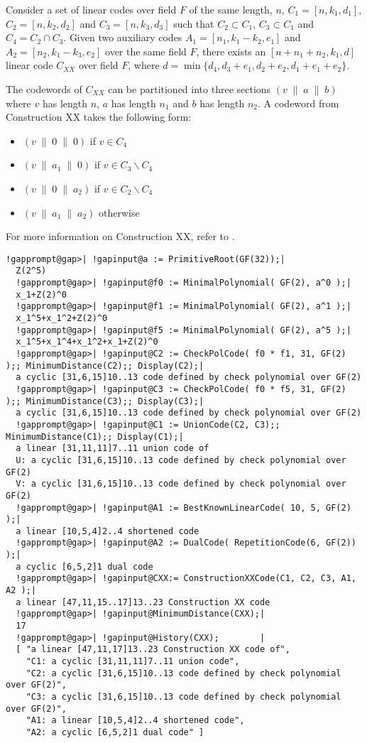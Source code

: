 \documentclass[a4paper,11pt]{report}
\begin{document}
{{{ Consider a set of linear codes over field $F$ of the same length, $n$, $C_1=[n, k_1, d_1]$, $C_2=[n, k_2, d_2]$ and $C_3=[n, k_3, d_3]$ such that $C_2 \subset C_1$, $C_3 \subset C_1$ and $C_4 = C_2 \cap C_3$. Given two auxiliary codes $A_1=[n_1, k_1-k_2, e_1]$ and $A_2=[n_2, k_1-k_3, e_2]$ over the same field $F$, there exists an $[n+n_1+n_2, k_1, d]$ linear code $C_{XX}$ over field $F$, where $d = \min\{d_4, d_3 + e_1, d_2 + e_2, d_1 + e_1 + e_2\}$. 

 The codewords of $C_{XX}$ can be partitioned into three sections $( v\;\|\;a\;\|\;b )$ where $v$ has length $n$, $a$ has length $n_1$ and $b$ has length $n_2$. A codeword from Construction XX takes the following form: 
\begin{itemize}
\item  $( v \; \| \; 0 \; \| \; 0 )$ if $v \in C_4$ 
\item  $( v \; \| \; a_1 \; \| \; 0 )$ if $v \in C_3 \backslash C_4$ 
\item  $( v \; \| \; 0 \; \| \; a_2 )$ if $v \in C_2 \backslash C_4$ 
\item  $( v \; \| \; a_1 \; \| \; a_2 )$ otherwise 
\end{itemize}
 For more information on Construction XX, refer to \cite{Alltop84}. }

 
\begin{Verbatim}[commandchars=!@|,fontsize=\small,frame=single,label=Example]
  !gapprompt@gap>| !gapinput@a := PrimitiveRoot(GF(32));|
  Z(2^5)
  !gapprompt@gap>| !gapinput@f0 := MinimalPolynomial( GF(2), a^0 );|
  x_1+Z(2)^0
  !gapprompt@gap>| !gapinput@f1 := MinimalPolynomial( GF(2), a^1 );|
  x_1^5+x_1^2+Z(2)^0
  !gapprompt@gap>| !gapinput@f5 := MinimalPolynomial( GF(2), a^5 );|
  x_1^5+x_1^4+x_1^2+x_1+Z(2)^0
  !gapprompt@gap>| !gapinput@C2 := CheckPolCode( f0 * f1, 31, GF(2) );; MinimumDistance(C2);; Display(C2);|
  a cyclic [31,6,15]10..13 code defined by check polynomial over GF(2)
  !gapprompt@gap>| !gapinput@C3 := CheckPolCode( f0 * f5, 31, GF(2) );; MinimumDistance(C3);; Display(C3);|
  a cyclic [31,6,15]10..13 code defined by check polynomial over GF(2)
  !gapprompt@gap>| !gapinput@C1 := UnionCode(C2, C3);; MinimumDistance(C1);; Display(C1);|
  a linear [31,11,11]7..11 union code of
  U: a cyclic [31,6,15]10..13 code defined by check polynomial over GF(2)
  V: a cyclic [31,6,15]10..13 code defined by check polynomial over GF(2)
  !gapprompt@gap>| !gapinput@A1 := BestKnownLinearCode( 10, 5, GF(2) );|
  a linear [10,5,4]2..4 shortened code
  !gapprompt@gap>| !gapinput@A2 := DualCode( RepetitionCode(6, GF(2)) );|
  a cyclic [6,5,2]1 dual code
  !gapprompt@gap>| !gapinput@CXX:= ConstructionXXCode(C1, C2, C3, A1, A2 );|
  a linear [47,11,15..17]13..23 Construction XX code
  !gapprompt@gap>| !gapinput@MinimumDistance(CXX);|
  17
  !gapprompt@gap>| !gapinput@History(CXX);        |
  [ "a linear [47,11,17]13..23 Construction XX code of", 
    "C1: a cyclic [31,11,11]7..11 union code", 
    "C2: a cyclic [31,6,15]10..13 code defined by check polynomial over GF(2)", 
    "C3: a cyclic [31,6,15]10..13 code defined by check polynomial over GF(2)", 
    "A1: a linear [10,5,4]2..4 shortened code", 
    "A2: a cyclic [6,5,2]1 dual code" ]
\end{Verbatim}
  

}}
\end{document}

